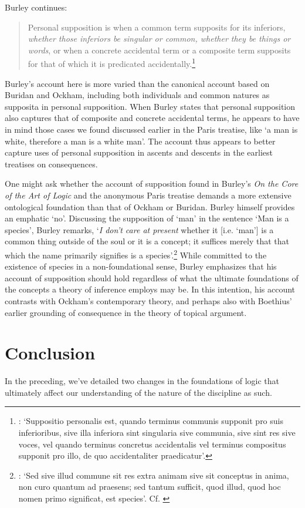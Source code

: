 \documentclass[a4paper, 11pt]{article}
\begin{document}
Burley continues:
\begin{quote}
Personal supposition is when a common term supposits for its inferiors, \emph{whether those inferiors be singular or common, whether they be things or words}, or when a concrete accidental term or a composite term supposits for that of which it is predicated accidentally.\footnote{\autocite[3.19-24]{BurleyDPAL}: `Suppositio personalis est, quando terminus communis supponit pro suis inferioribus, sive illa inferiora sint singularia sive communia, sive sint res sive voces, vel quando terminus concretus accidentalis vel terminus compositus supponit pro illo, de quo accidentaliter praedicatur'.}
\end{quote}
Burley's account here is more varied than the canonical account based on Buridan and Ockham, including both individuals and common natures as supposita in personal supposition. When Burley states that personal supposition also captures that of composite and concrete accidental terms, he appears to have in mind those cases we found discussed earlier in the Paris treatise, like `a man is white, therefore a man is a white man'. The account thus appears to better capture uses of personal supposition in ascents and descents in the earliest treatises on consequences. 

One might ask whether the account of supposition found in Burley's \emph{On the Core of the Art of Logic} and the anonymous Paris treatise demands a more extensive ontological foundation than that of Ockham or Buridan. Burley himself provides an emphatic `no'. Discussing the supposition of `man' in the sentence `Man is a species', Burley remarks, `\emph{I don't care at present} whether it [i.e. `man'] is a common thing outside of the soul or it is a concept; it suffices merely that that which the name primarily signifies is a species'.\footnote{\autocite[8.8-10]{BurleyDPAL}: `Sed sive illud commune sit res extra animam sive sit conceptus in anima, non curo quantum ad praesens; sed tantum sufficit, quod illud, quod hoc nomen primo significat, est species'. Cf. \autocite[196.33-37]{OckhamSL}} While committed to the existence of species in a non-foundational sense, Burley emphasizes that his account of supposition should hold regardless of what the ultimate foundations of the concepts a theory of inference employs may be. In this intention, his account contrasts with Ockham's contemporary theory, and perhaps also with Boethius' earlier grounding of consequence in the theory of topical argument.
\section{Conclusion}
In the preceding, we've detailed two changes in the foundations of logic that ultimately affect our understanding of the nature of the discipline as such. 
\end{document}
